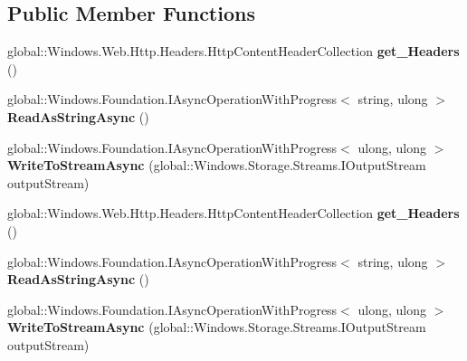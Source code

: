 \subsection*{Public Member Functions}
\begin{DoxyCompactItemize}
\item 
\mbox{\label{interface_windows_1_1_web_1_1_http_1_1_i_http_content_ae0cb5f56b7f9992187205375002cb2e8}} 
global\+::\+Windows.\+Web.\+Http.\+Headers.\+Http\+Content\+Header\+Collection {\bfseries get\+\_\+\+Headers} ()
\item 
\mbox{\label{interface_windows_1_1_web_1_1_http_1_1_i_http_content_aef4019ba8a9cebd9b1025bb90c9b27c2}} 
global\+::\+Windows.\+Foundation.\+I\+Async\+Operation\+With\+Progress$<$ string, ulong $>$ {\bfseries Read\+As\+String\+Async} ()
\item 
\mbox{\label{interface_windows_1_1_web_1_1_http_1_1_i_http_content_afe0268dc0fae8ae3351e2e463f08e7f2}} 
global\+::\+Windows.\+Foundation.\+I\+Async\+Operation\+With\+Progress$<$ ulong, ulong $>$ {\bfseries Write\+To\+Stream\+Async} (global\+::\+Windows.\+Storage.\+Streams.\+I\+Output\+Stream output\+Stream)
\item 
\mbox{\label{interface_windows_1_1_web_1_1_http_1_1_i_http_content_ae0cb5f56b7f9992187205375002cb2e8}} 
global\+::\+Windows.\+Web.\+Http.\+Headers.\+Http\+Content\+Header\+Collection {\bfseries get\+\_\+\+Headers} ()
\item 
\mbox{\label{interface_windows_1_1_web_1_1_http_1_1_i_http_content_aef4019ba8a9cebd9b1025bb90c9b27c2}} 
global\+::\+Windows.\+Foundation.\+I\+Async\+Operation\+With\+Progress$<$ string, ulong $>$ {\bfseries Read\+As\+String\+Async} ()
\item 
\mbox{\label{interface_windows_1_1_web_1_1_http_1_1_i_http_content_afe0268dc0fae8ae3351e2e463f08e7f2}} 
global\+::\+Windows.\+Foundation.\+I\+Async\+Operation\+With\+Progress$<$ ulong, ulong $>$ {\bfseries Write\+To\+Stream\+Async} (global\+::\+Windows.\+Storage.\+Streams.\+I\+Output\+Stream output\+Stream)

\end{DoxyCompactItemize}
